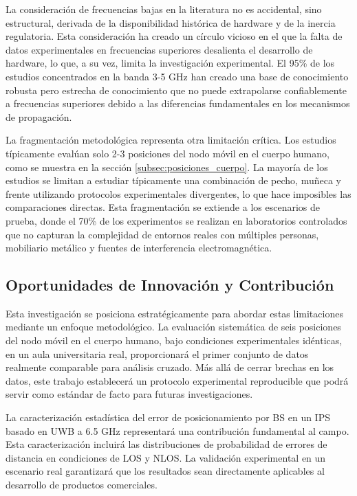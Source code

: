 La consideración de frecuencias bajas en la literatura no es accidental, sino estructural, derivada de la disponibilidad histórica de hardware y de la inercia regulatoria. Esta consideración ha creado un círculo vicioso en el que la falta de datos experimentales en frecuencias superiores desalienta el desarrollo de hardware, lo que, a su vez, limita la investigación experimental. El 95\% de los estudios concentrados en la banda 3-5 GHz han creado una base de conocimiento robusta pero estrecha de conocimiento que no puede extrapolarse confiablemente a frecuencias superiores debido a las diferencias fundamentales en los mecanismos de propagación.

La fragmentación metodológica representa otra limitación crítica. Los estudios típicamente evalúan solo 2-3 posiciones del nodo móvil en el cuerpo humano, como se muestra en la sección \ref{subsec:posiciones_cuerpo}. La mayoría de los estudios se limitan a estudiar típicamente una combinación de pecho, muñeca y frente utilizando protocolos experimentales divergentes, lo que hace imposibles las comparaciones directas. Esta fragmentación se extiende a los escenarios de prueba, donde el 70\% de los experimentos se realizan en laboratorios controlados que no capturan la complejidad de entornos reales con múltiples personas, mobiliario metálico y fuentes de interferencia electromagnética.

\subsection{Oportunidades de Innovación y Contribución}
\label{subsec:oportunidades_contribucion}

Esta investigación se posiciona estratégicamente para abordar estas limitaciones mediante un enfoque metodológico. La evaluación sistemática de seis posiciones del nodo móvil en el cuerpo humano, bajo condiciones experimentales idénticas, en un aula universitaria real, proporcionará el primer conjunto de datos realmente comparable para análisis cruzado. Más allá de cerrar brechas en los datos, este trabajo establecerá un protocolo experimental reproducible que podrá servir como estándar de facto para futuras investigaciones.

La caracterización estadística del error de posicionamiento por BS en un IPS basado en UWB a 6.5 GHz  representará una contribución fundamental al campo. Esta caracterización incluirá las distribuciones de probabilidad de errores de distancia en condiciones de LOS y NLOS. La validación experimental en un escenario real garantizará que los resultados sean directamente aplicables al desarrollo de productos comerciales.


